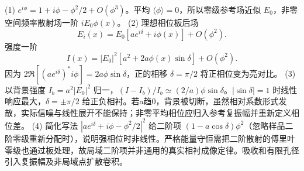 (1) \(e^{i\phi}=1+i\phi-\phi^2/2+O(\phi^3)\)。平均 \(\langle\phi\rangle=0\)，所以零级参考场近似 \(E_0\)，非零空间频率散射场一阶 \(iE_0\phi(x)\)。
(2) 理想相位板后场
\[
E_i(x)=E_0[ae^{i\delta}+i\phi(x)]+O(\phi^2).
\]
强度一阶
\[
I(x)=|E_0|^2[a^2+2a\phi(x)\sin\delta]+O(\phi^2).
\]
因为 \(2\Re[(ae^{i\delta})^*i\phi]=2a\phi\sin\delta\)，正的相移 \(\delta=\pi/2\) 将正相位变为亮对比。
(3) 以背景强度 \(I_b=a^2|E_0|^2\) 归一，\((I-I_b)/I_b\simeq(2/a)\phi\sin\delta\)。\(|\sin\delta|=1\) 时线性响应最大，\(\delta=\pm\pi/2\) 给正负相衬。若a趋0，背景被切断，虽然相对系数形式发散，实际信噪与线性展开不能保持；非零平均相位应归入参考复振幅并重新定义相位差。
(4) 简化写法 \(|ae^{i\delta}+i\phi-\phi^2/2|^2\) 给二阶项 \((1-a\cos\delta)\phi^2\)（忽略样品二阶零级重新分配时），说明强相位时非线性。严格能量守恒需把二阶散射的傅里叶零级也通过板处理，故局域二阶项并非通用的真实相衬成像定律。吸收和有限孔径引入复振幅及非局域点扩散卷积。
